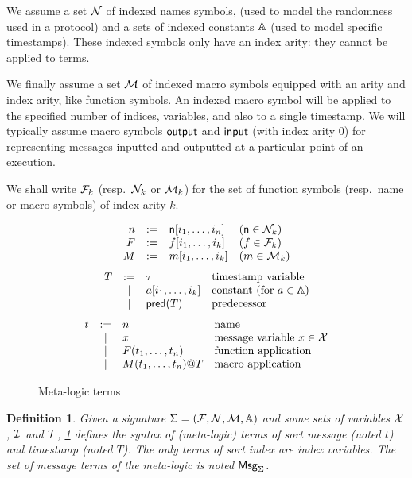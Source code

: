 \documentclass[a4paper]{article}
\newtheorem{definition}{Definition}
\theoremstyle{remark}
\begin{document}
We assume a set $\mathcal{N}$ of indexed names symbols,
(used to model the randomness used in a protocol)
and a sets of indexed constants $\mathbb{A}$
(used to model specific timestamps).
These indexed symbols only have an index arity: they
cannot be applied to terms.

We finally assume a set $\mathcal{M}$ of indexed macro symbols
equipped with an arity and index arity, like function symbols.
An indexed macro symbol will be applied to the specified number of
indices, variables, and also to a single timestamp.
We will typically assume macro symbols $\textsf{output}$ and $\textsf{input}$
(with index arity $0$) for representing messages inputted and outputted
at a particular point of an execution.

We shall write $\mathcal{F}_k$ (resp.\ $\mathcal{N}_k$ or $\mathcal{M}_k$) for the set of function
symbols (resp.\ name or macro symbols) of index arity $k$.

\begin{figure}
\[
  \begin{array}{rcll}
    n &:=& \mathsf{n}[i_1,\ldots,i_n] & (\mathsf{n}\in\mathcal{N}_k)
    \\
    F &:=& f[i_1,\ldots,i_k] & (f\in\mathcal{F}_k)
    \\
    M &:=& m[i_1,\ldots,i_k] & (m\in\mathcal{M}_k)
  \end{array}
\]
\[
  \begin{array}{rcll}
    T &:=& \tau & \text{timestamp variable} \\
      &\mid& a[i_1,\ldots,i_k] & \text{constant (for $a\in\mathbb{A}$)} \\
      &\mid & \textsf{pred}(T) & \text{predecessor}
\end{array}
   \]
\[
     \begin{array}{rcll}
    t & := & n &\text{name} \\
    & \mid & x  & \text{message variable $x\in\mathcal{X}$} \\
    & \mid & F(t_1,\dots,t_n) &\text{function application}\\
    & \mid & M(t_1,\ldots,t_n)@T &\text{macro application}\\
       \end{array}
     \]
     \caption{Meta-logic terms}\label{fig:terms}
\end{figure}

\begin{definition}
  Given a signature $\Sigma = (\mathcal{F},\mathcal{N},\mathcal{M},\mathbb{A})$ and some sets of variables
  $\mathcal{X}$, $\mathcal{I}$ and $\mathcal{T}$,
  \cref{fig:terms} defines the syntax of (meta-logic) terms
  of sort message (noted $t$) and timestamp (noted $T$).
  The only terms of sort index are index variables.
  The set of message terms of the meta-logic is noted $\mathsf{Msg}_\Sigma$.
\end{definition}
\end{document}
